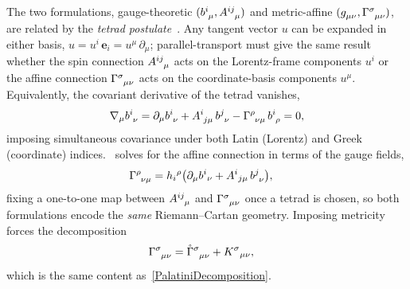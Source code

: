 The two formulations, gauge-theoretic
$(\tensor{b}{^i_\mu}, \tensor{A}{^{ij}_\mu})$ and metric-affine
$(\g{_{\mu\nu}}, \MAGA{^\sigma_\mu_\nu})$, are related by the
\emph{tetrad postulate}~\cite[eq.~(2.9)]{blagojevic2003lectures}.
Any tangent vector $u$ can be expanded in either basis,
$u = u^i\,\mathbf{e}_i = u^\mu\,\partial_\mu$;
parallel-transport must give the same result whether the
spin connection $\tensor{A}{^{ij}_\mu}$ acts on the Lorentz-frame
components $u^i$ or the affine connection $\MAGA{^\sigma_\mu_\nu}$
acts on the coordinate-basis components $u^\mu$. Equivalently,
the covariant derivative of the tetrad vanishes,
\begin{equation}
  \nabla_\mu \tensor{b}{^i_\nu}
    = \partial_\mu \tensor{b}{^i_\nu}
    + \tensor{A}{^i_{j\mu}}\,\tensor{b}{^j_\nu}
    - \MAGA{^\rho_{\nu\mu}}\,\tensor{b}{^i_\rho}
    = 0,
  \label{TetradPostulate}
\end{equation}
imposing simultaneous covariance under both Latin (Lorentz) and
Greek (coordinate) indices.~ solves
for the affine connection in terms of the gauge fields,
\begin{align}
  \MAGA{^\rho_{\nu\mu}}
    &= h_i{}^\rho\bigl(\partial_\mu b^i{}_\nu
       + A^i{}_{j\mu}\,\tensor{b}{^j_\nu}\bigr),
  \label{AffineFromGauge}
\end{align}
fixing a one-to-one map between $\tensor{A}{^{ij}_\mu}$ and
$\MAGA{^\sigma_\mu_\nu}$ once a tetrad is chosen, so both
formulations encode the \emph{same} Riemann--Cartan geometry.
Imposing metricity forces the
decomposition~\cite[eq.~(2.6)]{blagojevic2003lectures}
\begin{align}
  \MAGA{^\sigma_\mu_\nu} &= \rCon{^\sigma_\mu_\nu}
    + K^\sigma{}_{\mu\nu},
  \label{ContortionSplit}
\end{align}
which is the same content as~\cref{PalatiniDecomposition}.

